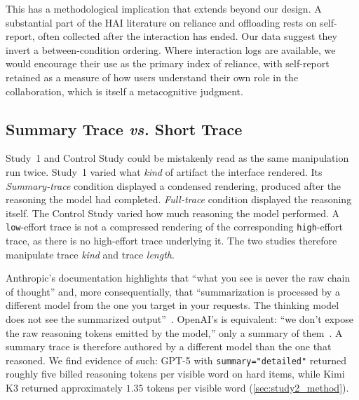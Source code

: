 \documentclass[manuscript,review,anonymous]{acmart}
\begin{document}
This has a methodological implication that extends beyond our design. A substantial part of the HAI literature on reliance and offloading rests on
self-report, often collected after the interaction has ended. Our data suggest they invert a between-condition ordering. Where interaction logs are available, we would encourage their use as the primary index
of reliance, with self-report retained as a measure of how users understand their own role in the collaboration, which is
itself a metacognitive judgment.

\subsection{Summary Trace \textit{vs.} Short Trace}\label{sec:trace_kinds}
Study~1 and Control Study could be mistakenly read as the same manipulation run twice. Study~1 varied what \emph{kind} of artifact the interface rendered. Its
\textit{Summary-trace} condition displayed a condensed rendering, produced after the reasoning the model had completed.
\textit{Full-trace} condition displayed the reasoning itself. The Control Study varied how much reasoning the model performed. A
\texttt{low}-effort trace is not a compressed rendering of the corresponding
\texttt{high}-effort trace, as there is no high-effort trace underlying it. The two studies therefore
manipulate trace \emph{kind} and trace \emph{length}.

Anthropic's documentation highlights that ``what you see is never the raw
chain of thought'' and, more consequentially, that ``summarization is processed by a different model from the one you target in your requests. The thinking model does not see the summarized output''~\cite{anthropic2026thinking}. OpenAI's is equivalent: ``we don't expose the raw reasoning tokens emitted by
the model,'' only a summary of them~\cite{openai2025reasoningapi}. A summary
trace is therefore authored by a different model than the one that reasoned. We find evidence of such: GPT-5 with \texttt{summary="detailed"} returned roughly five billed reasoning tokens per
visible word on hard items, while Kimi K3 returned approximately $1.35$ tokens per visible word (\autoref{sec:study2_method}). 
\end{document}

